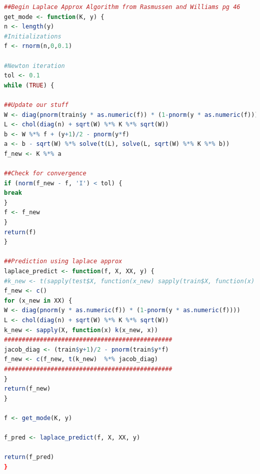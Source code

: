 \documentclass{article}
\begin{document}
\begin{lstlisting}[language=R]
##Begin Laplace Approx Algorithm from Rasmussen and Williams pg 46
get_mode <- function(K, y) {
n <- length(y)
#Initializations
f <- rnorm(n,0,0.1)

#Newton iteration
tol <- 0.1
while (TRUE) {

##Update our stuff
W <- diag(pnorm(train$y * as.numeric(f)) * (1-pnorm(y * as.numeric(f))))
L <- chol(diag(n) + sqrt(W) %*% K %*% sqrt(W))
b <- W %*% f + (y+1)/2 - pnorm(y*f)
a <- b - sqrt(W) %*% solve(t(L), solve(L, sqrt(W) %*% K %*% b))
f_new <- K %*% a

##Check for convergence
if (norm(f_new - f, 'I') < tol) {
break
}
f <- f_new
}
return(f)
}

##Prediction using laplace approx
laplace_predict <- function(f, X, XX, y) {
#k_new <- t(sapply(test$X, function(x_new) sapply(train$X, function(x) k(x_new, x))))
f_new <- c()
for (x_new in XX) {
W <- diag(pnorm(y * as.numeric(f)) * (1-pnorm(y * as.numeric(f))))
L <- chol(diag(n) + sqrt(W) %*% K %*% sqrt(W))
k_new <- sapply(X, function(x) k(x_new, x))
###############################################
jacob_diag <- (train$y+1)/2 - pnorm(train$y*f)
f_new <- c(f_new, t(k_new)  %*% jacob_diag)
###############################################
}
return(f_new)
}

f <- get_mode(K, y)

f_pred <- laplace_predict(f, X, XX, y)

return(f_pred)
}
	\end{lstlisting}
	
\end{document}
